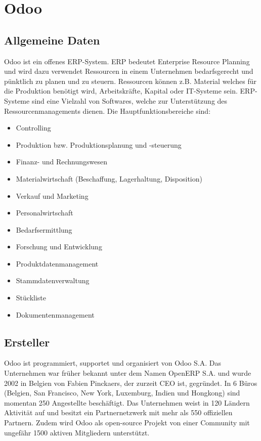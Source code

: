 \section{Odoo}

\subsection{Allgemeine Daten}
Odoo ist ein offenes ERP-System. ERP bedeutet Enterprise Resource Planning und wird dazu verwendet Ressourcen in einem Unternehmen bedarfsgerecht und pünktlich zu planen und zu steuern. Ressourcen können z.B. Material welches für die Produktion benötigt wird, Arbeitskräfte, Kapital oder IT-Systeme sein. ERP-Systeme sind eine Vielzahl von Softwares, welche zur Unterstützung des Ressourcenmanagements dienen. Die Hauptfunktionsbereiche sind:
\begin{itemize}
	\item Controlling
	\item Produktion bzw. Produktionsplanung und -steuerung
	\item Finanz- und Rechnungswesen
	\item Materialwirtschaft (Beschaffung, Lagerhaltung, Disposition)
	\item Verkauf und Marketing
	\item Personalwirtschaft
	\item Bedarfsermittlung
	\item Forschung und Entwicklung
	\item Produktdatenmanagement
	\item Stammdatenverwaltung
	\item Stückliste
	\item Dokumentenmanagement
\end{itemize}

\subsection{Ersteller}
Odoo ist programmiert, supportet und organisiert von Odoo S.A. Das Unternehmen war früher bekannt unter dem Namen OpenERP S.A. und wurde 2002 in Belgien von Fabien Pinckaers, der zurzeit CEO ist, gegründet. In 6 Büros (Belgien, San Francisco, New York, Luxemburg, Indien und Hongkong) sind momentan 250 Angestellte beschäftigt. Das Unternehmen weist in 120 Ländern Aktivität auf und besitzt ein Partnernetzwerk mit mehr als 550 offiziellen Partnern. Zudem wird Odoo als open-source Projekt von einer Community mit ungefähr 1500 aktiven Mitgliedern unterstützt.

